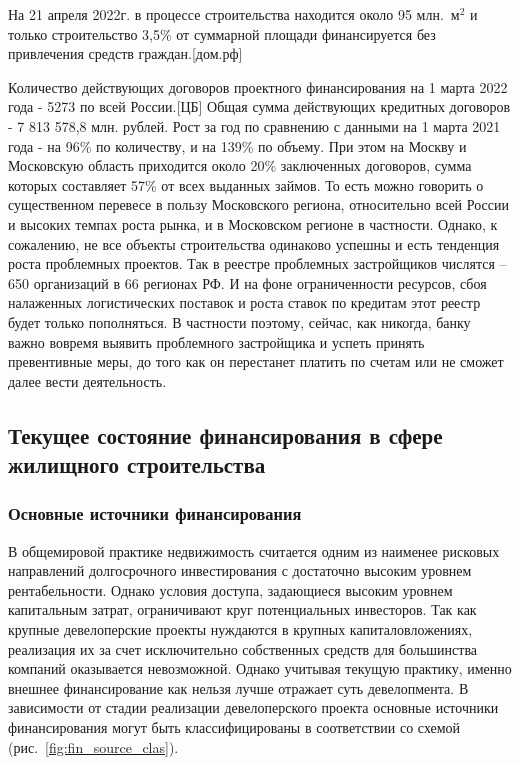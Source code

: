 \documentclass[12pt,a4paper]{article} %
\begin{document}
На 21 апреля 2022г. в процессе строительства находится около 95 млн.~$\text{м}^2$ и только строительство 3,5\% от суммарной площади финансируется без привлечения средств граждан.[дом.рф]
 
Количество действующих договоров проектного финансирования на 1 марта 2022 года - 5273 по всей России.[ЦБ] Общая сумма действующих кредитных договоров - 7 813 578,8 млн. рублей.
Рост за год по сравнению с данными на 1 марта 2021 года - на 96\% по количеству, и на 139\% по объему.
При этом на Москву и Московскую область приходится около 20\% заключенных договоров, сумма которых составляет 57\% от всех выданных займов. То есть можно говорить о существенном перевесе в пользу Московского региона, относительно всей России и высоких темпах роста рынка, и в Московском регионе в частности. Однако, к сожалению, не все объекты строительства одинаково успешны и есть тенденция роста проблемных проектов. Так в реестре проблемных застройщиков числятся – 650 организаций в 66 регионах РФ. И на фоне ограниченности ресурсов, сбоя налаженных логистических поставок и роста ставок по кредитам этот реестр будет только пополняться. В частности поэтому, сейчас, как никогда, банку важно вовремя выявить проблемного застройщика и успеть принять превентивные меры, до того как он перестанет платить по счетам или не сможет далее вести деятельность.  

\subsection{Текущее состояние финансирования в сфере жилищного строительства}

\subsubsection{Основные источники финансирования }

В общемировой практике недвижимость считается одним из наименее рисковых направлений долгосрочного инвестирования с достаточно высоким уровнем рентабельности. Однако условия доступа, задающиеся высоким уровнем капитальным затрат, ограничивают круг потенциальных инвесторов. Так как крупные девелоперские проекты нуждаются в крупных капиталовложениях, реализация их за счет исключительно собственных средств для большинства компаний оказывается невозможной. Однако учитывая текущую практику, именно внешнее финансирование как нельзя лучше отражает суть девелопмента.
В зависимости от стадии реализации девелоперского проекта основные источники финансирования могут быть классифицированы в соответствии со схемой (рис.~\ref{fig:fin_source_clas}). 
\end{document}
